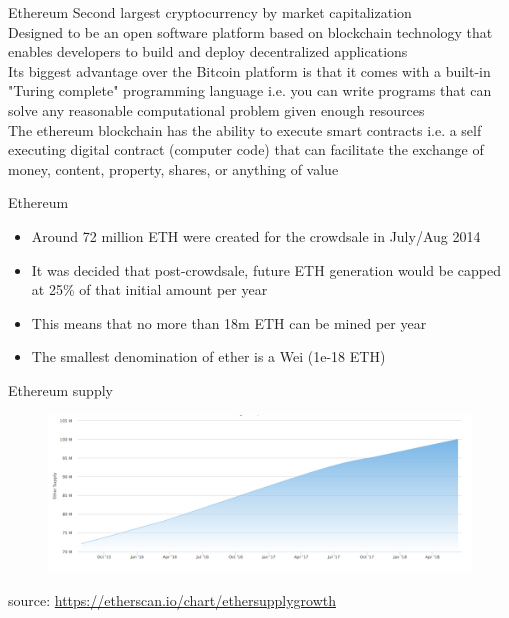 \documentclass[11pt]{beamer}
\begin{document}

\begin{frame}{Ethereum}
	Second largest cryptocurrency by market capitalization \\ \vspace{3mm}
	Designed to be an open software platform based on blockchain technology that enables developers to build and deploy decentralized applications\\ \vspace{3mm}
	Its biggest advantage over the Bitcoin platform is that it comes with a built-in "Turing complete" programming language i.e. you can write programs that can solve any reasonable computational problem given enough resources\\ \vspace{3mm}
	The ethereum blockchain has the ability to execute smart contracts i.e. a self executing digital contract (computer code) that can facilitate the exchange of money, content, property, shares, or anything of value
\end{frame}


\begin{frame}{Ethereum}
	\begin{itemize}
		\item Around 72 million ETH were created for the crowdsale in July/Aug 2014
		\item It was decided that post-crowdsale, future ETH generation would be capped at 25\% of that initial amount per year
		\item This means that no more than 18m ETH can be mined per year
		\item The smallest denomination of ether is a Wei (1e-18 ETH)
	\end{itemize}
\end{frame}


\begin{frame}{Ethereum supply}
	\begin{figure}[]
		\centering
		\includegraphics  [scale=0.25]{Images/eth-supply}
	\end{figure}
	\begin{scriptsize}
		source: \href{https://etherscan.io/chart/ethersupplygrowth}{https://etherscan.io/chart/ethersupplygrowth}
	\end{scriptsize}
\end{frame}
\end{document}
